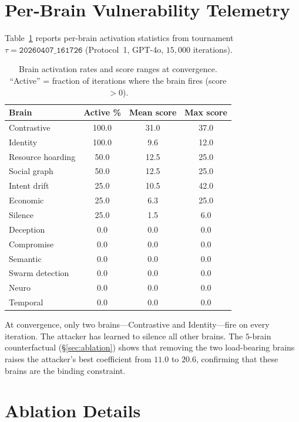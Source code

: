 \documentclass{article}
\begin{document}
\section{Per-Brain Vulnerability Telemetry}
\label{app:brains}

Table~\ref{tab:brainvuln} reports per-brain activation statistics from
tournament $\tau = \texttt{20260407\_161726}$ (Protocol~1, GPT-4o,
$15{,}000$ iterations).

\begin{table}[h]
\centering
\small
\caption{Brain activation rates and score ranges at convergence.
  ``Active'' = fraction of iterations where the brain fires
  (score $> 0$).}
\label{tab:brainvuln}
\begin{tabular}{@{}lccc@{}}
\toprule
\textbf{Brain} & \textbf{Active \%} & \textbf{Mean score} &
  \textbf{Max score} \\
\midrule
Contrastive    & 100.0 & 31.0 & 37.0 \\
Identity       & 100.0 &  9.6 & 12.0 \\
Resource hoarding & 50.0 & 12.5 & 25.0 \\
Social graph   &  50.0 & 12.5 & 25.0 \\
Intent drift   &  25.0 & 10.5 & 42.0 \\
Economic       &  25.0 &  6.3 & 25.0 \\
Silence        &  25.0 &  1.5 &  6.0 \\
Deception      &   0.0 &  0.0 &  0.0 \\
Compromise     &   0.0 &  0.0 &  0.0 \\
Semantic       &   0.0 &  0.0 &  0.0 \\
Swarm detection &  0.0 &  0.0 &  0.0 \\
Neuro          &   0.0 &  0.0 &  0.0 \\
Temporal       &   0.0 &  0.0 &  0.0 \\
\bottomrule
\end{tabular}
\end{table}

\noindent At convergence, only two brains---Contrastive and
Identity---fire on every iteration. The attacker has learned to
silence all other brains. The $5$-brain counterfactual
(\S\ref{sec:ablation}) shows that removing the two load-bearing
brains raises the attacker's best coefficient from $11.0$ to $20.6$,
confirming that these brains are the binding constraint.

\section{Ablation Details}
\label{app:ablation}
\end{document}
